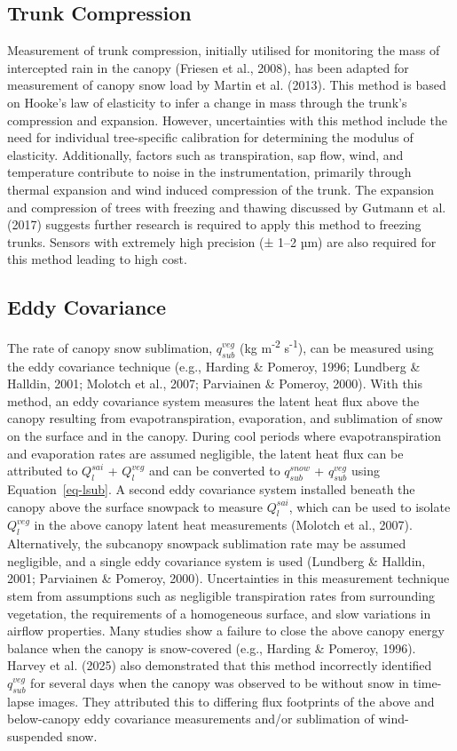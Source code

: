 \documentclass[
  letterpaper,
]{tex/uofsthesis-cs}
\begin{document}
\subsection{Trunk Compression}\label{trunk-compression}

Measurement of trunk compression, initially utilised for monitoring the
mass of intercepted rain in the canopy (Friesen et al., 2008), has been
adapted for measurement of canopy snow load by Martin et al. (2013).
This method is based on Hooke's law of elasticity to infer a change in
mass through the trunk's compression and expansion. However,
uncertainties with this method include the need for individual
tree-specific calibration for determining the modulus of elasticity.
Additionally, factors such as transpiration, sap flow, wind, and
temperature contribute to noise in the instrumentation, primarily
through thermal expansion and wind induced compression of the trunk. The
expansion and compression of trees with freezing and thawing discussed
by Gutmann et al. (2017) suggests further research is required to apply
this method to freezing trunks. Sensors with extremely high precision (±
1--2 µm) are also required for this method leading to high cost.

\subsection{Eddy Covariance}\label{eddy-covariance}

The rate of canopy snow sublimation, \(q_{sub}^{veg}\) (kg
m\textsuperscript{-2} s\textsuperscript{-1}), can be measured using the
eddy covariance technique (e.g., Harding \& Pomeroy, 1996; Lundberg \&
Halldin, 2001; Molotch et al., 2007; Parviainen \& Pomeroy, 2000). With
this method, an eddy covariance system measures the latent heat flux
above the canopy resulting from evapotranspiration, evaporation, and
sublimation of snow on the surface and in the canopy. During cool
periods where evapotranspiration and evaporation rates are assumed
negligible, the latent heat flux can be attributed to \(Q_l^{sai}\) +
\(Q_l^{veg}\) and can be converted to \(q_{sub}^{snow}\) +
\(q_{sub}^{veg}\) using Equation~\ref{eq-lsub}. A second eddy covariance
system installed beneath the canopy above the surface snowpack to
measure \(Q_l^{sai}\), which can be used to isolate \(Q_l^{veg}\) in the
above canopy latent heat measurements (Molotch et al., 2007).
Alternatively, the subcanopy snowpack sublimation rate may be assumed
negligible, and a single eddy covariance system is used (Lundberg \&
Halldin, 2001; Parviainen \& Pomeroy, 2000). Uncertainties in this
measurement technique stem from assumptions such as negligible
transpiration rates from surrounding vegetation, the requirements of a
homogeneous surface, and slow variations in airflow properties. Many
studies show a failure to close the above canopy energy balance when the
canopy is snow-covered (e.g., Harding \& Pomeroy, 1996). Harvey et al.
(2025) also demonstrated that this method incorrectly identified
\(q_{sub}^{veg}\) for several days when the canopy was observed to be
without snow in time-lapse images. They attributed this to differing
flux footprints of the above and below-canopy eddy covariance
measurements and/or sublimation of wind-suspended snow.
\end{document}
